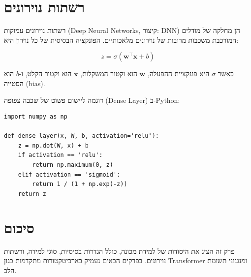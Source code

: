 \section{רשתות נוירונים}

רשתות נוירונים עמוקות (\textenglish{Deep Neural Networks}, קיצור: \textenglish{DNN})
הן מחלקה של מודלים המורכבת משכבות מרובות של נוירונים מלאכותיים. הפונקציה הבסיסית של
כל נוירון היא:

\begin{equation}
    z = \sigma\!\left( \mathbf{w}^\top \mathbf{x} + b \right)
\end{equation}

כאשר \(\sigma\) היא פונקציית ההפעלה, \(\mathbf{w}\) הוא וקטור המשקלות, \(\mathbf{x}\) הוא
וקטור הקלט, ו-\(b\) הוא הסטייה (\textenglish{bias}).

דוגמה ליישום פשוט של שכבה צפופה (\textenglish{Dense Layer}) ב-\textenglish{Python}:

\begin{LTR}
\begin{verbatim}
import numpy as np

def dense_layer(x, W, b, activation='relu'):
    z = np.dot(W, x) + b
    if activation == 'relu':
        return np.maximum(0, z)
    elif activation == 'sigmoid':
        return 1 / (1 + np.exp(-z))
    return z
\end{verbatim}
\end{LTR}

\section{סיכום}

פרק זה הציג את היסודות של למידת מכונה, כולל הגדרות בסיסיות, סוגי למידה, ורשתות נוירונים.
בפרקים הבאים נעמיק בארכיטקטורות מתקדמות כגון \textenglish{Transformer} ומנגנוני תשומת הלב.
